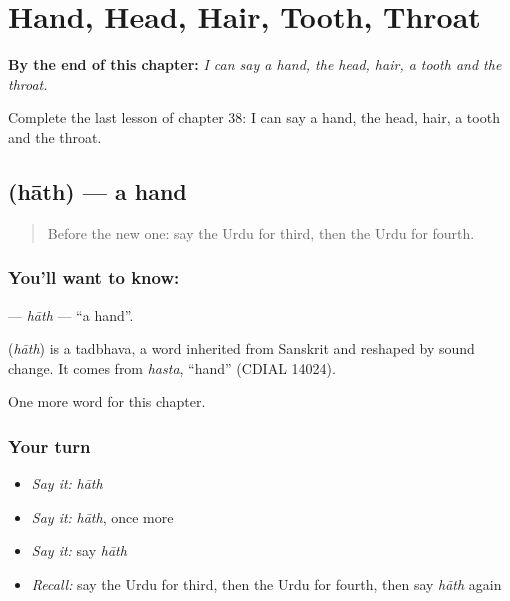 
\chapter{Hand, Head, Hair, Tooth, Throat}
\label{ch:ur-hand-head-hair-tooth-throat}

\begin{chapteropening}
\textbf{By the end of this chapter:} \emph{I can say a hand, the head, hair, a tooth and the throat.}

Complete the last lesson of chapter 38: I can say a hand, the head, hair, a tooth and the throat.
\end{chapteropening}

\section[\texorpdfstring{\ur{ہاتھ} (hāth)}{ہاتھ (hāth)}]{ (hāth) — a hand}

\label{lesson:UR-C38-hath}



\begin{quote}
Before the new one: say the Urdu for third, then the Urdu for fourth.
\end{quote}

\subsection*{You'll want to know: }
\textbf{} — \emph{hāth} — \textquotedblleft{}a hand\textquotedblright{}.

\begin{cousinweb}
\textbf{} (\emph{hāth}) is a tadbhava, a word inherited from Sanskrit and reshaped by sound change. It comes from \emph{hasta}, \textquotedblleft{}hand\textquotedblright{} (CDIAL 14024).
\end{cousinweb}

\begin{grammarlens}[title={What you've built}]
One more word for this chapter.
\end{grammarlens}

\subsection*{Your turn}
\begin{itemize}
\raggedright
  \item \emph{Say it:} \emph{hāth}
  \item \emph{Say it:} \emph{hāth}, once more
  \item \emph{Say it:} say \emph{hāth}
  \item \emph{Recall:} say the Urdu for third, then the Urdu for fourth, then say \emph{hāth} again
\end{itemize}

